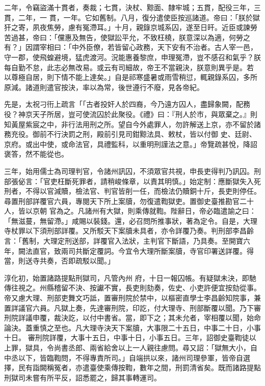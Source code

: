 \begin{pinyinscope}
 二年，令竊盜滿十貫者，奏裁；七貫，決杖、黥面、隸牢城；五貫，配役三年，三貫，二年，一
 貫，一年。它如舊制。八月，復分遣使臣按巡諸道。帝曰：「朕於獄犴之寄，夙夜焦勞，慮有冤滯耳。」十月，親錄京城系囚，遂至日旰。近臣或諫勞苦過甚，帝曰：「儻惠及無告，使獄訟平允，不致枉橈，朕意深以為適，何勞之有？」因謂宰相曰：「中外臣僚，若皆留心政務，天下安有不治者。古人宰一邑，守一郡，使飛蝗避境，猛虎渡河。況能惠養黎庶，申理冤滯，豈不感召和氣乎？朕每自勤不怠，此志必無改易。或云有司細故，帝王不當親決，朕意則異乎是。若
 以尊極自居，則下情不能上達矣。」自是祁寒盛暑或雨雪稍愆，輒親錄系囚，多所原減。諸道則遣官按決，率以為常，後世遵行不廢，見各帝紀。



 先是，太祝刁衎上疏言「「古者投奸人於四裔，今乃遠方囚人，盡歸象闕，配務役？神京天子所居，豈可使流囚於此聚役。《禮》曰：『刑人於市，與眾棄之。』則知黃屋紫宸之中，非行法用刑之所。望自今外處罪人，勿許解送上京，亦不留於諸務充役。御前不行決罰之刑，殿前引見司鉗黥法具、敕杖，皆以付御
 史、廷尉、京府。或出中使，或命法官，具禮監科，以重明刑謹法之意。」帝覽疏甚悅，降詔褒答，然不能從也。



 三年，始用儒士為司理判官，令諸州訊囚，不須眾官共視，申長吏得判乃訊囚。刑部張佖言：「官吏枉斷死罪者，請稍峻條章，以責其明慎。」始定制：應斷獄失入死刑者，不得以官減贖，檢法官、判官皆削一任，而檢法仍贖銅十斤，長吏則停任。尋置刑部詳覆官六員，專閱天下所上案牘，勿復遣鞫獄吏。置御史臺推勘官二十人，皆以京朝
 官為之。凡諸州有大獄，則乘傳就鞫。陛辭日，帝必臨遣諭之曰：「無滋蔓，無留滯。」咸賜以裝錢。還，必召問所推事狀，著為定令。自是，大理寺杖罪以下須刑部詳覆。又所駁天下案牘未具者，亦令詳覆乃奏。判刑部李昌齡言：「舊制，大理定刑送部，詳覆官入法狀，主判官下斷語，乃具奏。至開寶六年，闕法直官，致兩司共斷定覆詞。今宜令大理所斷案牘，寺官印署送詳覆。得當，則送寺共奏，否即疏駁以聞。」



 淳化初，始置諸路提點刑獄司，凡管內州
 府，十日一報囚帳。有疑獄未決，即馳傳往視之。州縣稽留不決、按讞不實，長吏則劾奏，佐史、小吏許便宜按劾從事。帝又慮大理、刑部吏舞文巧詆，置審刑院於禁中，以樞密直學士李昌齡知院事，兼置詳議官六員。凡獄上奏，先達審刑院，印訖，付大理寺、刑部斷覆以聞。乃下審刑院詳議申覆，裁決訖，以付中書省。當，即下之；其未允者，宰相覆以聞，始命論決。蓋重慎之至也。凡大理寺決天下案牘，大事限二十五日，中事二十日，小事十日。
 審刑院詳覆，大事十五日，中事十日，小事五日。三年，詔御史臺鞫徒以上罪，獄具，令尚書丞郎、兩省給舍以上一人親往慮問。尋又詔：「獄無大小，自中丞以下，皆臨鞫問，不得專責所司。」自端拱以來，諸州司理參軍，皆帝自選擇，民有詣闕稱冤者，亦遣臺使乘傳按鞫，數年之間，刑罰清省矣。既而諸路提點刑獄司未嘗有所平反，詔悉罷之，歸其事轉運司。




\end{pinyinscope}
